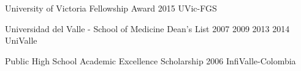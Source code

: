 \begin{cvhonors}
  \cvhonor
    {University of Victoria Fellowship Award} %
    {2015} %
    {UVic-FGS} %
    {} %

  \cvhonor
    {Universidad del Valle - School of Medicine Dean's List} %
    {2007 2009 2013 2014} %
    {UniValle} %
    {} %

  \cvhonor
    {Public High School Academic Excellence Scholarship} %
    {2006} %
    {InfiValle-Colombia} %
    {} %


\end{cvhonors}








